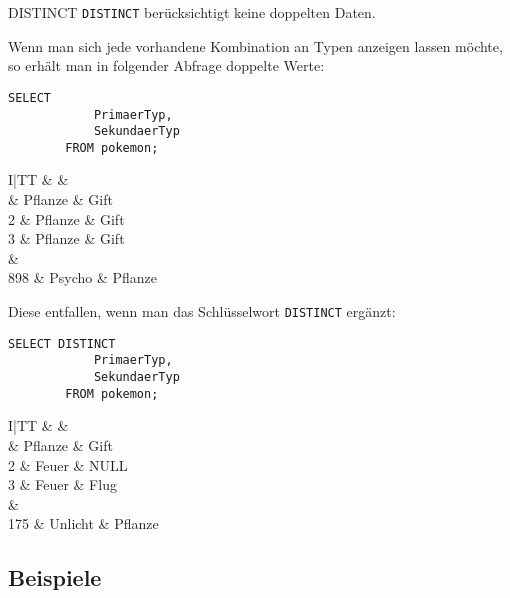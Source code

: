 \begin{sql}{DISTINCT}
    \texttt{DISTINCT} berücksichtigt keine doppelten Daten.

    Wenn man sich jede vorhandene Kombination an Typen anzeigen lassen möchte, so erhält man in folgender Abfrage doppelte Werte:

    \begin{lstlisting}[style=SqlInputStyle]
        SELECT
            PrimaerTyp,
            SekundaerTyp
        FROM pokemon;
    \end{lstlisting}

    \begin{tabular}{I|TT}
        &  &  \\ & Pflanze & Gift \\
        2 & Pflanze & Gift \\
        3 & Pflanze & Gift \\
         &  \\
        898 & Psycho & Pflanze \\
    \end{tabular}

    Diese entfallen, wenn man das Schlüsselwort \texttt{DISTINCT} ergänzt:

    \begin{lstlisting}[style=SqlInputStyle]
        SELECT DISTINCT
            PrimaerTyp,
            SekundaerTyp
        FROM pokemon;
    \end{lstlisting}

    \begin{tabular}{I|TT}
        &  &  \\ & Pflanze & Gift \\
        2 & Feuer & NULL \\
        3 & Feuer & Flug \\
         &  \\
        175 & Unlicht & Pflanze \\
    \end{tabular}
\end{sql}

\subsection{Beispiele}

